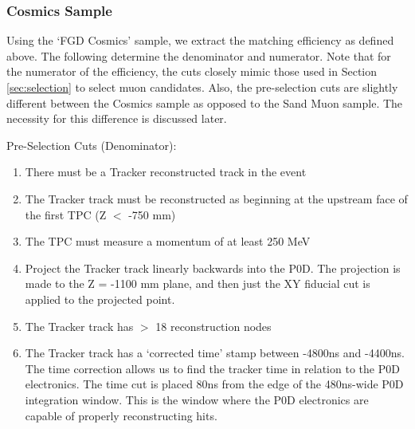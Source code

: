 \subsubsection{Cosmics Sample}
\label{sec:CosmicsEfficiency}

Using the `FGD Cosmics' sample, we extract the matching efficiency as defined above. The following determine the denominator and numerator. Note that for the numerator of the efficiency, the cuts closely mimic those used in Section \ref{sec:selection} to select muon candidates. Also, the pre-selection cuts are slightly different between the Cosmics sample as opposed to the Sand Muon sample. The necessity for this difference is discussed later.

Pre-Selection Cuts (Denominator):

\begin{enumerate}
\item There must be a Tracker reconstructed track in the event
\item The Tracker track must be reconstructed as beginning at the upstream face of the first TPC (Z \(<\) -750 mm)
\item The TPC must measure a momentum of at least 250 MeV
\item Project the Tracker track linearly backwards into the P0D. The projection is made to the Z = -1100 mm plane, and then just the XY fiducial cut is applied to the projected point.
\item The Tracker track has \(>\) 18 reconstruction nodes
\item The Tracker track has a `corrected time' stamp between -4800ns and -4400ns. The time correction allows us to find the tracker time in relation to the P0D electronics. The time cut is placed 80ns from the edge of the 480ns-wide P0D integration window. This is the window where the P0D electronics are capable of properly reconstructing hits.
\end{enumerate}

